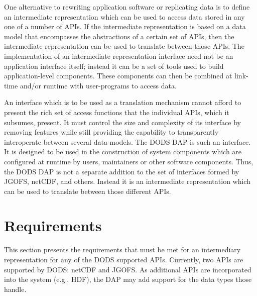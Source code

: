 One alternative to rewriting application software or replicating data is to
define an intermediate representation which can be used to access data stored
in any one of a number of APIs.  If the intermediate representation is based
on a data model that encompasses the abstractions of a certain set of APIs,
then the intermediate representation can be used to translate between those
APIs. The implementation of an intermediate representation interface need not
be an application interface itself; instead it can be a set of tools used to
build application-level components. These components can then be combined at
link-time and/or runtime with user-programs to access data.

An interface which is to be used as a translation mechanism cannot afford to
present the rich set of access functions that the individual APIs, which it
subsumes, present. It must control the size and complexity of its interface by
removing features while still providing the capability to transparently
interoperate between several data models.  The DODS DAP is such an interface.
It is designed to be used in the construction of system components which are
configured at runtime by users, maintainers or other software components.
Thus, the DODS DAP is not a separate addition to the set of interfaces formed
by JGOFS, netCDF, and others.  Instead it is an intermediate representation
which can be used to translate between those different APIs.

\section{Requirements}

This section presents the requirements that must be met for an intermediary
representation for any of the DODS supported APIs. Currently, two APIs are
supported by DODS: netCDF and JGOFS\@. As additional APIs are incorporated
into the system (e.g., HDF), the DAP may add support for the data types those
handle.

